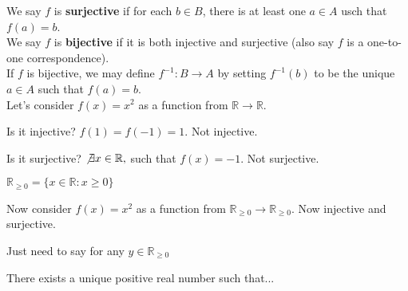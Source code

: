 \documentclass[a4paper, 11pt, twoside]{article}
\begin{document}
We say $f$ is \textbf{surjective} if for each $b\in B$, there is at least one $a\in A$ usch that $f(a)=b$.\\

We say $f$ is \textbf{bijective} if it is both injective and surjective (also say $f$ is a one-to-one correspondence).\\

If $f$ is bijective, we may define $f^{-1}: B\to A$ by setting $f^{-1}(b)$ to be the unique $a\in A$ such that $f(a)=b$.\\

Let's consider $f(x)=x^2$ as a function from $\mathbb{R}\to\mathbb{R}$.

Is it injective? $f(1)=f(-1)=1$. Not injective.

Is it surjective? $\not\exists x \in \mathbb{R},$ such that $f(x)=-1$. Not surjective.

$\mathbb{R}_{\geq 0} = \{x\in\mathbb{R}: x\geq 0\}$

Now consider $f(x)=x^2$ as a function from $\mathbb{R}_{\geq 0}\to \mathbb{R}_{\geq 0}$. Now injective and surjective.

Just need to say for any $y\in\mathbb{R}_{\geq 0}$ 

There exists a unique positive real number such that...
\end{document}
